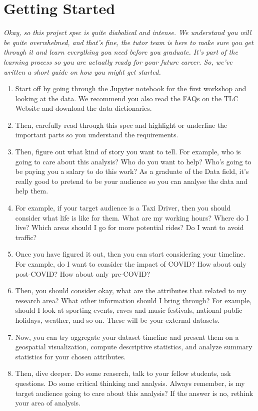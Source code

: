 \documentclass[12pt]{article}
\begin{document}
\section*{Getting Started}
\textit{Okay, so this project spec is quite diabolical and intense. We understand you will be quite overwhelmed, and that's fine, the tutor team is here to make sure you get through it and learn everything you need before you graduate. It's part of the learning process so you are actually ready for your future career. So, we've written a short guide on how you might get started.}
\begin{enumerate}
    \item Start off by going through the Jupyter notebook for the first workshop and looking at the data. We recommend you also read the FAQs on the TLC Website and download the data dictionaries.
    \item Then, carefully read through this spec and highlight or underline the important parts so you understand the requirements.
    \item Then, figure out what kind of story you want to tell. For example, who is going to care about this analysis? Who do you want to help? Who's going to be paying you a salary to do this work? As a graduate of the Data field, it's really good to pretend to be your audience so you can analyse the data and help them.
    \item For example, if your target audience is a Taxi Driver, then you should consider what life is like for them. What are my working hours? Where do I live? Which areas should I go for more potential rides? Do I want to avoid traffic? 
    \item Once you have figured it out, then you can start considering your timeline. For example, do I want to consider the impact of COVID? How about only post-COVID? How about only pre-COVID?
    \item Then, you should consider okay, what are the attributes that related to my research area? What other information should I bring through? For example, should I look at sporting events, raves and music festivals, national public holidays, weather, and so on. These will be your external datasets.
    \item Now, you can try aggregate your dataset timeline and present them on a geospatial visualization, compute descriptive statistics, and analyze summary statistics for your chosen attributes.
    \item Then, dive deeper. Do some reaserch, talk to your fellow students, ask questions. Do some critical thinking and analysis. Always remember, is my target audience going to care about this analysis? If the answer is no, rethink your area of analysis. 

\end{enumerate}
\end{document}
